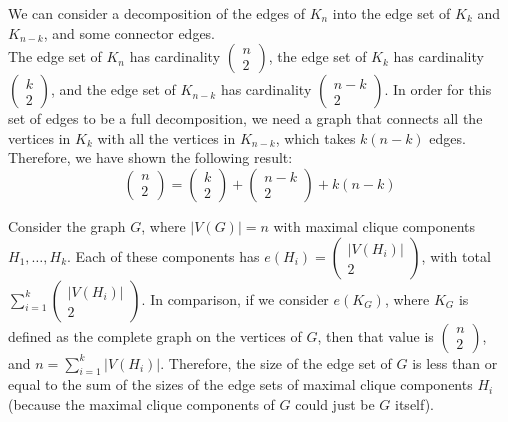 \documentclass[9pt]{extarticle}
\begin{document}
  \begin{solution}
    \begin{tcolorbox}[colback = white, title = (a), breakable]
      We can consider a decomposition of the edges of $K_n$ into the edge set of $K_k$ and $K_{n-k}$, and some connector edges.\\

      The edge set of $K_n$ has cardinality $\begin{pmatrix}n\\2\end{pmatrix}$, the edge set of $K_k$ has cardinality $\begin{pmatrix}k\\2\end{pmatrix}$, and the edge set of $K_{n-k}$ has cardinality $\begin{pmatrix}n-k \\ 2\end{pmatrix}$. In order for this set of edges to be a full decomposition, we need a graph that connects all the vertices in $K_k$ with all the vertices in $K_{n-k}$, which takes $k(n-k)$ edges. Therefore, we have shown the following result:
      \[
        \begin{pmatrix}
          n\\
          2
        \end{pmatrix} = \begin{pmatrix}
          k\\
          2
        \end{pmatrix} + \begin{pmatrix}
          n-k\\
          2
        \end{pmatrix} + k(n-k)
      \] 
    \end{tcolorbox}
    \begin{tcolorbox}[colback = white, title = (b), breakable]
      Consider the graph $G$, where $|V(G)| = n$ with maximal clique components $H_{1},\dots,H_{k}$. Each of these components has $e(H_i) = \begin{pmatrix}|V(H_i)|\\2\end{pmatrix}$, with total $\sum_{i=1}^{k}\begin{pmatrix}|V(H_i)| \\ 2\end{pmatrix}$. In comparison, if we consider $e(K_{G})$, where $K_G$ is defined as the complete graph on the vertices of $G$, then that value is $\begin{pmatrix}n \\ 2\end{pmatrix}$, and $n = \sum_{i = 1}^{k} |V(H_i)|$. Therefore, the size of the edge set of $G$ is less than or equal to the sum of the sizes of the edge sets of maximal clique components $H_i$ (because the maximal clique components of $G$ could just be $G$ itself).
    \end{tcolorbox}
  \end{solution}
\end{document}
